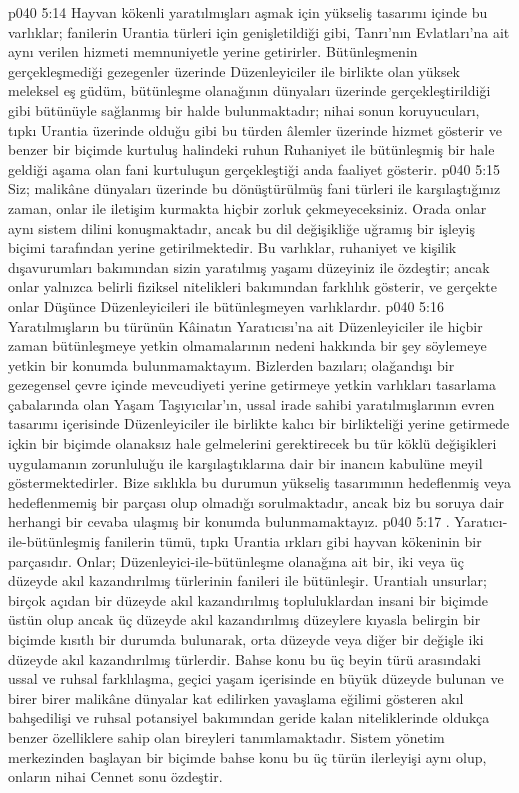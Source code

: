 \vs p040 5:14 Hayvan kökenli yaratılmışları aşmak için yükseliş tasarımı içinde bu varlıklar; fanilerin Urantia türleri için genişletildiği gibi, Tanrı’nın Evlatları’na ait aynı verilen hizmeti memnuniyetle yerine getirirler. Bütünleşmenin gerçekleşmediği gezegenler üzerinde Düzenleyiciler ile birlikte olan yüksek meleksel eş güdüm, bütünleşme olanağının dünyaları üzerinde gerçekleştirildiği gibi bütünüyle sağlanmış bir halde bulunmaktadır; nihai sonun koruyucuları, tıpkı Urantia üzerinde olduğu gibi bu türden âlemler üzerinde hizmet gösterir ve benzer bir biçimde kurtuluş halindeki ruhun Ruhaniyet ile bütünleşmiş bir hale geldiği aşama olan fani kurtuluşun gerçekleştiği anda faaliyet gösterir.
\vs p040 5:15 Siz; malikâne dünyaları üzerinde bu dönüştürülmüş fani türleri ile karşılaştığınız zaman, onlar ile iletişim kurmakta hiçbir zorluk çekmeyeceksiniz. Orada onlar aynı sistem dilini konuşmaktadır, ancak bu dil değişikliğe uğramış bir işleyiş biçimi tarafından yerine getirilmektedir. Bu varlıklar, ruhaniyet ve kişilik dışavurumları bakımından sizin yaratılmış yaşamı düzeyiniz ile özdeştir; ancak onlar yalnızca belirli fiziksel nitelikleri bakımından farklılık gösterir, ve gerçekte onlar Düşünce Düzenleyicileri ile bütünleşmeyen varlıklardır.
\vs p040 5:16 Yaratılmışların bu türünün Kâinatın Yaratıcısı’na ait Düzenleyiciler ile hiçbir zaman bütünleşmeye yetkin olmamalarının nedeni hakkında bir şey söylemeye yetkin bir konumda bulunmamaktayım. Bizlerden bazıları; olağandışı bir gezegensel çevre içinde mevcudiyeti yerine getirmeye yetkin varlıkları tasarlama çabalarında olan Yaşam Taşıyıcılar’ın, ussal irade sahibi yaratılmışlarının evren tasarımı içerisinde Düzenleyiciler ile birlikte kalıcı bir birlikteliği yerine getirmede içkin bir biçimde olanaksız hale gelmelerini gerektirecek bu tür köklü değişikleri uygulamanın zorunluluğu ile karşılaştıklarına dair bir inancın kabulüne meyil göstermektedirler. Bize sıklıkla bu durumun yükseliş tasarımının hedeflenmiş veya hedeflenmemiş bir parçası olup olmadığı sorulmaktadır, ancak biz bu soruya dair herhangi bir cevaba ulaşmış bir konumda bulunmamaktayız.
\vs p040 5:17 . Yaratıcı\hyp{}ile\hyp{}bütünleşmiş fanilerin tümü, tıpkı Urantia ırkları gibi hayvan kökeninin bir parçasıdır. Onlar; Düzenleyici\hyp{}ile\hyp{}bütünleşme olanağına ait bir, iki veya üç düzeyde akıl kazandırılmış türlerinin fanileri ile bütünleşir. Urantialı unsurlar; birçok açıdan bir düzeyde akıl kazandırılmış topluluklardan insani bir biçimde üstün olup ancak üç düzeyde akıl kazandırılmış düzeylere kıyasla belirgin bir biçimde kısıtlı bir durumda bulunarak, orta düzeyde veya diğer bir değişle iki düzeyde akıl kazandırılmış türlerdir. Bahse konu bu üç beyin türü arasındaki ussal ve ruhsal farklılaşma, geçici yaşam içerisinde en büyük düzeyde bulunan ve birer birer malikâne dünyalar kat edilirken yavaşlama eğilimi gösteren akıl bahşedilişi ve ruhsal potansiyel bakımından geride kalan niteliklerinde oldukça benzer özelliklere sahip olan bireyleri tanımlamaktadır. Sistem yönetim merkezinden başlayan bir biçimde bahse konu bu üç türün ilerleyişi aynı olup, onların nihai Cennet sonu özdeştir.
